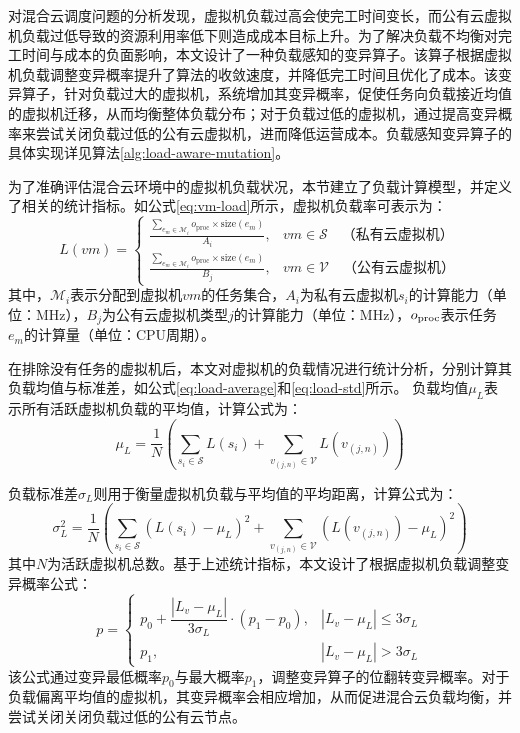 对混合云调度问题的分析发现，虚拟机负载过高会使完工时间变长，而公有云虚拟机负载过低导致的资源利用率低下则造成成本目标上升。为了解决负载不均衡对完工时间与成本的负面影响，本文设计了一种负载感知的变异算子。该算子根据虚拟机负载调整变异概率提升了算法的收敛速度，并降低完工时间且优化了成本。该变异算子，针对负载过大的虚拟机，系统增加其变异概率，促使任务向负载接近均值的虚拟机迁移，从而均衡整体负载分布；对于负载过低的虚拟机，通过提高变异概率来尝试关闭负载过低的公有云虚拟机，进而降低运营成本。负载感知变异算子的具体实现详见算法\ref{alg:load-aware-mutation}。

为了准确评估混合云环境中的虚拟机负载状况，本节建立了负载计算模型，并定义了相关的统计指标。如公式\eqref{eq:vm-load}所示，虚拟机负载率可表示为：
\begin{equation} L(vm) =
    \begin{cases} \frac{\sum_{e_m \in \mathcal{M}_i} o_{\text{proc}}\times \text{size}(e_m)}{A_i}, & vm \in \mathcal{S}\quad \text{（私有云虚拟机）} \\ \frac{\sum_{e_m \in \mathcal{M}_i} o_{\text{proc}}\times \text{size}(e_m)}{B_j}, & vm \in \mathcal{V}\quad \text{（公有云虚拟机）}
    \end{cases} \label{eq:vm-load}
\end{equation}
其中，$\mathcal{M}_i$表示分配到虚拟机$vm$的任务集合，$A_i$为私有云虚拟机$s_i$的计算能力（单位：MHz），$B_j$为公有云虚拟机类型$j$的计算能力（单位：MHz），$o_{\textup{proc}}$表示任务$e_m$的计算量（单位：CPU周期）。

在排除没有任务的虚拟机后，本文对虚拟机的负载情况进行统计分析，分别计算其负载均值与标准差，如公式\eqref{eq:load-average}和\eqref{eq:load-std}所示。
负载均值$\mu_L$表示所有活跃虚拟机负载的平均值，计算公式为：
\begin{equation}
    \mu_L = \frac{1}{N} \left( \sum_{s_i \in \mathcal{S}} L(s_i) + \sum_{v_{(j,n)} \in \mathcal{V}} L(v_{(j,n)}) \right)
    \label{eq:load-average}
\end{equation}

负载标准差$\sigma_L$则用于衡量虚拟机负载与平均值的平均距离，计算公式为：
\begin{equation}
    \sigma_L^2 =  \frac{1}{N} \left(
        \sum_{s_i \in \mathcal{S}} (L(s_i) - \mu_L)^2 + \sum_{v_{(j,n)} \in \mathcal{V}} (L(v_{(j,n)}) - \mu_L)^2
    \right)
    \label{eq:load-std}
\end{equation}
其中$N$为活跃虚拟机总数。基于上述统计指标，本文设计了根据虚拟机负载调整变异概率公式：
\begin{equation}
    p =
    \begin{cases}
        p_0 + \dfrac{|L_v - \mu_L|}{3\sigma_L} \cdot (p_1 - p_0), & |L_v - \mu_L| \leq 3\sigma_L \\
        p_1, & |L_v - \mu_L| > 3\sigma_L
    \end{cases}
    \label{eq:vm-load-prob}
\end{equation}
该公式通过变异最低概率$p_0$与最大概率$p_1$，调整变异算子的位翻转变异概率。对于负载偏离平均值的虚拟机，其变异概率会相应增加，从而促进混合云负载均衡，并尝试关闭关闭负载过低的公有云节点。

